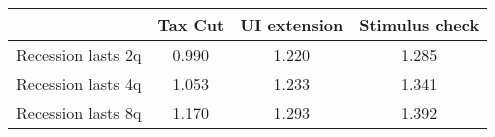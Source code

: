 \begin{tabular}{@{}lccc@{}}
\toprule
& Tax Cut    & UI extension    & Stimulus check    \\  \midrule
Recession lasts 2q &0.990  & 1.220  & 1.285     \\
Recession lasts 4q &1.053  & 1.233  & 1.341     \\
Recession lasts 8q &1.170  & 1.293  & 1.392     \\
\end{tabular}

